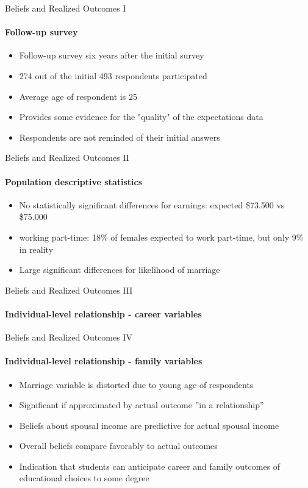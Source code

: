 \documentclass[12pt]{beamer}
\begin{document}
\begin{frame}{Beliefs and Realized Outcomes I}
    \framesubtitle{Follow-up survey}
    \begin{itemize}
        \item Follow-up survey six years after the initial survey
        \item 274 out of the initial 493 respondents participated
        \item Average age of respondent is 25
        \item Provides some evidence for the "quality" of the expectations data
        \item Respondents are not reminded of their initial answers
    \end{itemize}
    
\end{frame}

\begin{frame}{Beliefs and Realized Outcomes II}
    \framesubtitle{Population descriptive statistics}
    \begin{itemize}
        \item No statistically significant differences for earnings: expected \$73.500 vs \$75.000
        \item working part-time: 18\% of females expected to work part-time, but only 9\% in reality
        \item Large significant differences for likelihood of marriage
    \end{itemize}
\end{frame}

\begin{frame}{Beliefs and Realized Outcomes III}
    \framesubtitle{Individual-level relationship - career variables}
    \begin{center}
    \end{center}
\end{frame}

\begin{frame}{Beliefs and Realized Outcomes IV}
    \framesubtitle{Individual-level relationship - family variables}
    \begin{itemize}
        \item Marriage variable is distorted due to young age of respondents
        \item Significant if approximated by actual outcome ”in a relationship”
        \item Beliefs about spousal income are predictive for actual spousal income
        \vspace{0.5cm}
        \item Overall beliefs compare favorably to actual outcomes
        \item Indication that students can anticipate career and family outcomes of educational choices to some degree
    \end{itemize}
\end{frame}
\end{document}
